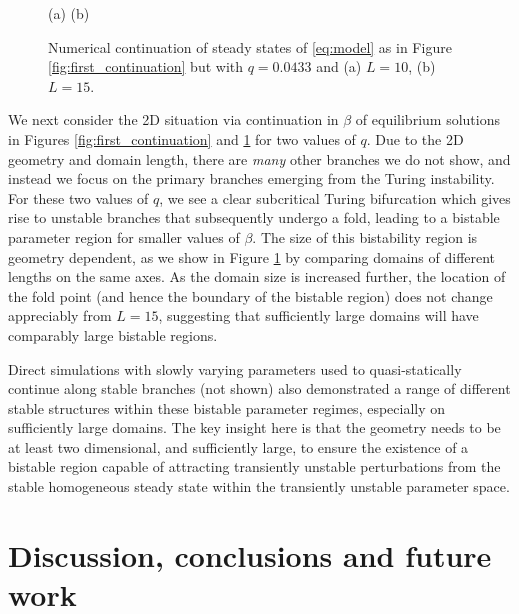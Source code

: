 \documentclass{article}
\begin{document}
{{\begin{figure}
        \hspace{0.4cm} (a) \hspace{5.7cm} (b) \hfill
        
        \caption{{Numerical continuation of steady states of \eqref{eq:model} as in Figure \ref{fig:first_continuation} but with $q = 0.0433$ and (a) $L = 10$, (b) $L=15$.}}
        \label{fig:q0.0433_L10}
    \end{figure}
    
    We next consider the 2D situation via continuation in $\beta$ of equilibrium solutions in Figures \ref{fig:first_continuation} and \ref{fig:q0.0433_L10} for two values of $q$. Due to the 2D geometry and domain length, there are \emph{many} other branches we do not show, and instead we focus on the primary branches emerging from the Turing instability. For these two values of $q$, we see a clear subcritical Turing bifurcation which gives rise to unstable branches that subsequently undergo a fold, leading to a bistable parameter region for smaller values of $\beta$. The size of this bistability region is geometry dependent, as we show in Figure \ref{fig:q0.0433_L10} by comparing domains of different lengths on the same axes. As the domain size is increased further, the location of the fold point (and hence the boundary of the bistable region) does not change appreciably from $L=15$, suggesting that sufficiently large domains will have comparably large bistable regions.
    
    Direct simulations with slowly varying parameters used to quasi-statically continue along stable branches (not shown) also demonstrated a range of different stable structures within these bistable parameter regimes, especially on sufficiently large domains. The key insight here is that the geometry needs to be at least two dimensional, and sufficiently large, to ensure the existence of a bistable region capable of attracting transiently unstable perturbations from the stable homogeneous steady state within the transiently unstable parameter space.}



\section{Discussion, conclusions and future work}\label{Sec_Discussion}


}
\end{document}
